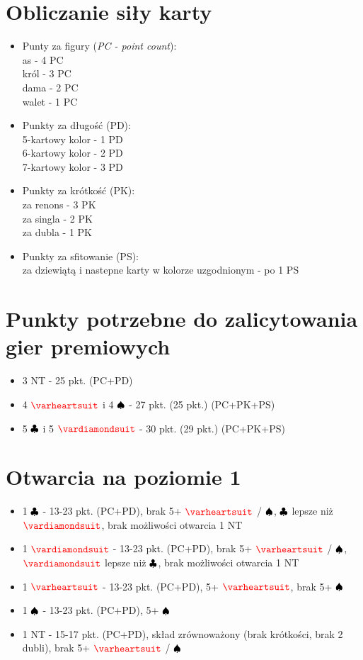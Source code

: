 \documentclass{article}
\newcommand*\Hs[1]{\ensuremath{\color{red}\varheartsuit}}
\newcommand*\Ss[1]{\ensuremath{\color{black}\spadesuit}}
\newcommand*\Ds[1]{\ensuremath{\color{red}\vardiamondsuit}}
\newcommand*\Cs[1]{\ensuremath{\color{black}\clubsuit}}
\newcommand*\NT[1]{{\color{black}\textsc{NT}}}
\begin{document}
    \section{Obliczanie siły karty}
    	\begin{itemize}
    	\item Punty za figury (\textit{PC - point count}): \\
    		as - 4 PC \\ 
    		król - 3 PC \\
    		dama - 2 PC \\
    		walet - 1 PC
    	\item Punkty za długość (PD): \\
    		5-kartowy kolor - 1 PD \\
    		6-kartowy kolor - 2 PD \\
    		7-kartowy kolor - 3 PD
    	\item Punkty za krótkość (PK): \\
    		za renons - 3 PK \\
    		za singla - 2 PK \\
    		za dubla - 1 PK 
    	\item Punkty za sfitowanie (PS): \\
    		za dziewiątą i nastepne karty w kolorze uzgodnionym - po 1 PS 
    	\end{itemize}
    \section{Punkty potrzebne do zalicytowania gier premiowych}
    	\begin{itemize}
    	\item 3 \NT{} - 25 pkt. (PC+PD) 
    	\item 4 \Hs{} i 4 \Ss{} - 27 pkt. (25 pkt.) (PC+PK+PS) 
    	\item 5 \Cs{} i 5 \Ds{} - 30 pkt. (29 pkt.) (PC+PK+PS)  
    	\end{itemize}
    \section{Otwarcia na poziomie 1}
    	\begin{itemize}
    	\item 1 \Cs{} - 13-23 pkt. (PC+PD), brak 5+ \Hs{} / \Ss{}, \Cs{} lepsze niż \Ds{}, brak możliwości otwarcia 1 \NT{}
    	\item 1 \Ds{} - 13-23 pkt. (PC+PD), brak 5+ \Hs{} / \Ss{}, \Ds{} lepsze niż \Cs{}, brak możliwości otwarcia 1 \NT{}
    	\item 1 \Hs{} - 13-23 pkt. (PC+PD), 5+ \Hs{}, brak 5+ \Ss{} 
    	\item 1 \Ss{} - 13-23 pkt. (PC+PD), 5+ \Ss{}
    	\item 1 \NT{} - 15-17 pkt. (PC+PD), skład zrównoważony (brak krótkości, brak 2 dubli), brak 5+ \Hs{} / \Ss{}
    	\end{itemize}
\end{document}
